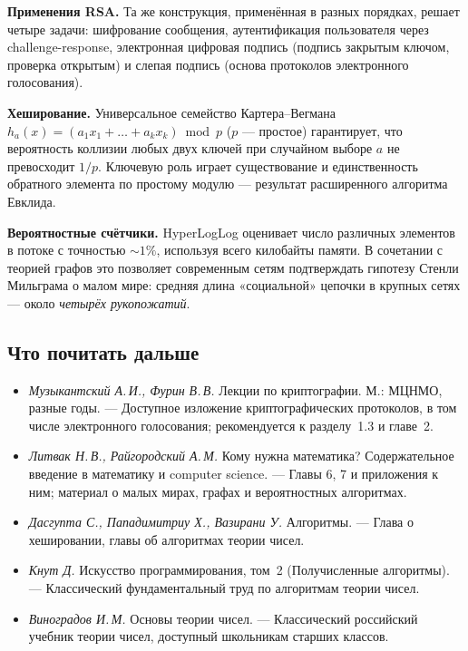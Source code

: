 \begin{tcolorbox}
\textbf{Применения RSA.} Та же конструкция, применённая в разных порядках, решает четыре задачи: шифрование сообщения, аутентификация пользователя через challenge-response, электронная цифровая подпись (подпись закрытым ключом, проверка открытым) и слепая подпись (основа протоколов электронного голосования).

\textbf{Хеширование.} Универсальное семейство Картера--Вегмана $h_a(x) = (a_1 x_1 + \dots + a_k x_k) \bmod p$ ($p$ --- простое) гарантирует, что вероятность коллизии любых двух ключей при случайном выборе $a$ не превосходит $1/p$. Ключевую роль играет существование и единственность обратного элемента по простому модулю --- результат расширенного алгоритма Евклида.

\textbf{Вероятностные счётчики.} HyperLogLog оценивает число различных элементов в потоке с точностью $\sim 1\%$, используя всего килобайты памяти. В сочетании с теорией графов это позволяет современным сетям подтверждать гипотезу Стенли Мильграма о малом мире: средняя длина «социальной» цепочки в крупных сетях --- около \emph{четырёх рукопожатий}.
\end{tcolorbox}

\subsection*{Что почитать дальше}

\begin{itemize}
  \item \emph{Музыкантский А.\,И., Фурин В.\,В.} Лекции по криптографии. М.: МЦНМО, разные годы. --- Доступное изложение криптографических протоколов, в том числе электронного голосования; рекомендуется к разделу~1.3 и главе~2.
  \item \emph{Литвак Н.\,В., Райгородский А.\,М.} Кому нужна математика? Содержательное введение в математику и computer science. --- Главы 6, 7 и приложения к ним; материал о малых мирах, графах и вероятностных алгоритмах.
  \item \emph{Дасгупта С., Пападимитриу Х., Вазирани У.} Алгоритмы. --- Глава о хешировании, главы об алгоритмах теории чисел.
  \item \emph{Кнут Д.} Искусство программирования, том~2 (Получисленные алгоритмы). --- Классический фундаментальный труд по алгоритмам теории чисел.
  \item \emph{Виноградов И.\,М.} Основы теории чисел. --- Классический российский учебник теории чисел, доступный школьникам старших классов.
\end{itemize}

